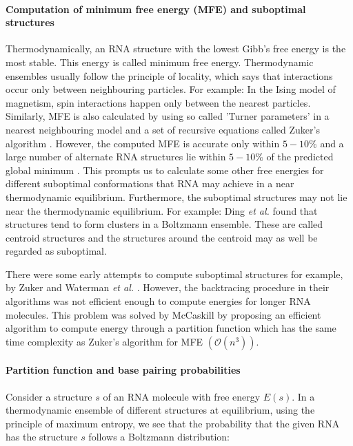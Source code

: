 \paragraph{Computation of minimum free energy (MFE) and suboptimal structures}
Thermodynamically, an RNA structure with the lowest Gibb's free energy is the most stable. This energy is called minimum free energy. Thermodynamic ensembles usually follow the principle of locality, which says that interactions occur only between neighbouring particles. For example: In the Ising model of magnetism, spin interactions happen only between the nearest particles. Similarly, MFE is also calculated by using so called 'Turner parameters' \cite{turner2009nndb} in a nearest neighbouring model and a set of recursive equations called Zuker's algorithm \cite{zuker1981optimal}. However, the computed MFE is accurate only within $5-10\%$ and a large number of alternate RNA structures lie within $5-10\%$ of the predicted global minimum \cite{eddy2004rna}. This prompts us to calculate some other free energies for different suboptimal conformations that RNA may achieve in a near thermodynamic equilibrium. Furthermore, the suboptimal structures may not lie near the thermodynamic equilibrium. For example: Ding \textit{et al.} \cite{ding2008ab}  found that structures tend to form clusters in a Boltzmann ensemble. These are called centroid structures and the structures around the centroid may as well be regarded as suboptimal. 

There were some early attempts to compute suboptimal structures for example, by Zuker \cite{zuker1989finding} and Waterman \textit{et al.} \cite{waterman1985dynamic}. However, the backtracing procedure in their algorithms was not efficient enough to compute energies for longer RNA molecules. This problem was solved by McCaskill \cite{mccaskill1990equilibrium} by proposing an efficient algorithm to compute energy through a partition function which has the same time complexity as Zuker's algorithm for MFE $(\mathcal{O}(n^{3}))$.

\paragraph{Partition function and base pairing probabilities}
Consider a structure $s$ of an RNA molecule with free energy $E(s)$. In a thermodynamic ensemble of different structures at equilibrium, using the principle of maximum entropy, we see that the probability that the given RNA has the structure $s$ follows a Boltzmann distribution:

